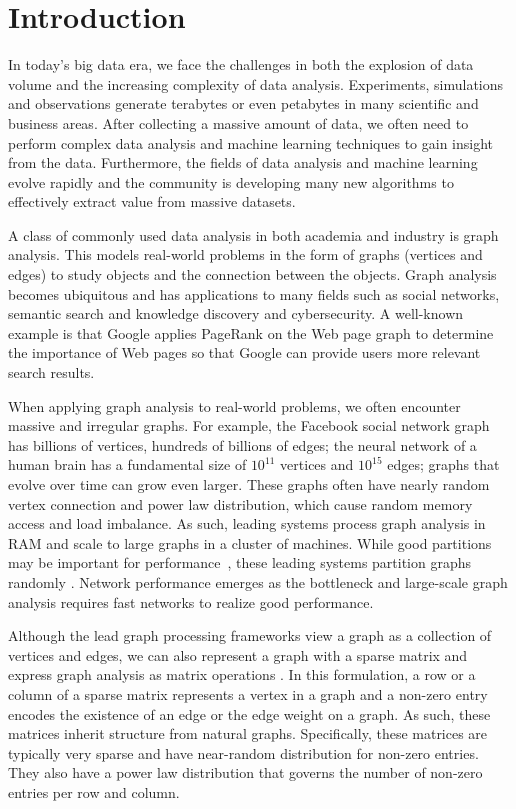 \chapter{Introduction}
\label{sec:intro}

In today's big data era, we face the challenges in both the explosion of
data volume and the increasing complexity of data analysis. Experiments,
simulations and observations generate terabytes or
even petabytes in many scientific and business areas. After collecting
a massive amount of data, we often need to perform complex data analysis
and machine learning techniques to gain insight from the data. Furthermore,
the fields of data analysis and machine learning evolve rapidly and the community
is developing many new algorithms to effectively extract value from massive
datasets.

A class of commonly used data analysis in both academia and industry is graph
analysis. This models
real-world problems in the form of graphs (vertices and edges) to study objects
and the connection between the objects. Graph analysis becomes ubiquitous
and has applications to many fields such as social networks, semantic search
and knowledge discovery and cybersecurity. A well-known example is that Google
applies PageRank \cite{pagerank} on the Web page graph to determine the importance
of Web pages so that Google can provide users more relevant search results.

When applying graph analysis to real-world problems, we often encounter
massive and irregular graphs. For example, the Facebook social network graph
has billions of vertices, hundreds of billions of edges; the neural network
of a human brain has a fundamental size of $10^{11}$ vertices and $10^{15}$ edges;
graphs that evolve over time can grow even larger. These graphs often have
nearly random vertex connection and power law distribution, which cause random
memory access and load imbalance. As such, leading systems process graph analysis
in RAM and scale to large graphs in a cluster of machines. While good partitions
may be important for performance~\cite{surfer}, these leading systems partition
graphs randomly \cite{powergraph}. Network performance emerges as the bottleneck
and large-scale graph analysis requires fast networks to realize good performance.

Although the lead graph processing frameworks view a graph as a collection of
vertices and edges, we can also represent a graph with a sparse matrix and
express graph analysis
as matrix operations \cite{Mattson13}. In this formulation, a row
or a column of a sparse matrix represents a vertex in a graph and a non-zero
entry encodes the existence of an edge or the edge weight on a graph.
As such, these matrices inherit structure from natural graphs. Specifically,
these matrices are typically very sparse and have near-random distribution
for non-zero entries. They also have a power law distribution that governs
the number of non-zero entries per row and column.

